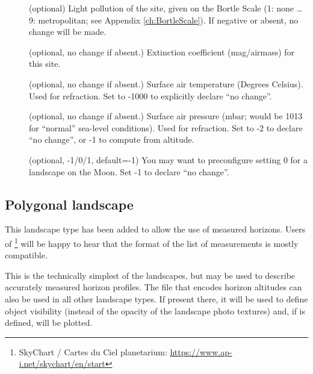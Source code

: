 \begin{description}
\item[] (optional) Light pollution of the site,
  given on the Bortle Scale (1: none \ldots 9: metropolitan; see
  Appendix \ref{ch:BortleScale}). If negative or absent, no change
  will be made.
\item[] (optional, no change
  if absent.) Extinction coefficient (mag/airmass) for this site.
\item[] (optional, no change if absent.)
  Surface air temperature (Degrees Celsius). Used for refraction. Set
  to -1000 to explicitly declare ``no change''.
\item[] (optional, no change if absent.)
  Surface air pressure (mbar; would be 1013 for ``normal'' sea-level
  conditions). Used for refraction. Set to -2 to declare ``no change'',
  or -1 to compute from altitude.
\item[] (optional, -1/0/1, default=-1) You may want
  to preconfigure setting 0 for a landscape on the Moon. Set -1 to
  declare ``no change''.
\end{description}


\subsection{Polygonal landscape}
\label{sec:landscapes:Polygonal}

This landscape type has been added  to allow
the use of measured horizons. Users of \footnote{SkyChart / Cartes du Ciel planetarium:
  \url{https://www.ap-i.net/skychart/en/start}} will be happy to hear
that the format of the list of measurements is mostly compatible.

This is the technically simplest of the landscapes, but may be used to
describe accurately measured horizon profiles. The file that encodes
horizon altitudes can also be used in all other landscape types. If
present there, it will be used to define object visibility (instead of
the opacity of the landscape photo textures) and, if
 is defined, will be plotted.

